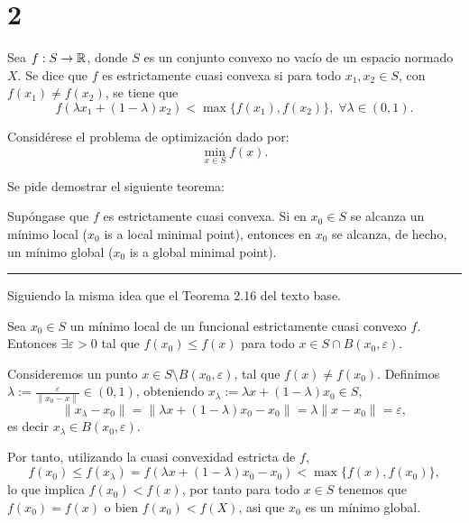 \section*{2}

Sea $f: S \rightarrow \mathbb{R}$, donde $S$ es un conjunto convexo no vacío de un espacio normado $X$.
Se dice que $f$ es estrictamente cuasi convexa si para todo $x_1 , x_2 \in S$,
con $f(x_1) \neq f(x_2)$, se tiene que
\begin{equation*}
    f(\lambda x_1 + (1 - \lambda) x_2) < \max\{ f(x_1), f(x_2) \}, \; \forall \lambda \in (0, 1).
\end{equation*}

Considérese el problema de optimización dado por:
\begin{equation*}
    \min_{x \in S} f(x).
\end{equation*}

Se pide demostrar el siguiente teorema:

\begin{theorem}
    Supóngase que $f$ es estrictamente cuasi convexa.
    Si en $x_0 \in S$ se alcanza un mínimo local ($x_0$ is a local minimal point),
    entonces en $x_0$ se alcanza, de hecho, un mínimo global ($x_0$ is a global minimal point).
\end{theorem}

\noindent\rule{10cm}{0.4pt}

Siguiendo la misma idea que el Teorema 2.16 del texto base.

Sea $x_0 \in S$ un mínimo local de un funcional estrictamente cuasi convexo $f$.
Entonces $\exists \varepsilon > 0$ tal que $f(x_0) \leq f(x)$ para todo $x \in S \cap B(x_0, \varepsilon)$.

Consideremos un punto $x \in S \setminus B(x_0, \varepsilon)$, tal que $f(x) \neq f(x_0)$.
Definimos $\lambda := \frac{\varepsilon}{\| x_0 - x \|} \in (0, 1)$,
obteniendo $x_\lambda := \lambda x + (1 - \lambda) x_0 \in S$,
\begin{equation*}
    \| x_\lambda - x_0 \| = \| \lambda x + (1 - \lambda) x_0 - x_0 \| = \lambda \| x - x_0 \| = \varepsilon,
\end{equation*}
es decir $x_\lambda \in B(x_0, \varepsilon)$.

Por tanto, utilizando la cuasi convexidad estricta de $f$,
\begin{equation*}
    f(x_0) \leq f(x_\lambda) = f(\lambda x + (1 - \lambda) x_0 - x_0) < \max \{ f(x), f(x_0) \},
\end{equation*}
lo que implica $f(x_0) < f(x)$, por tanto para todo $x \in S$ tenemos que $f(x_0) = f(x)$ o bien $f(x_0) < f(X)$,
asi que $x_0$ es un mínimo global.

